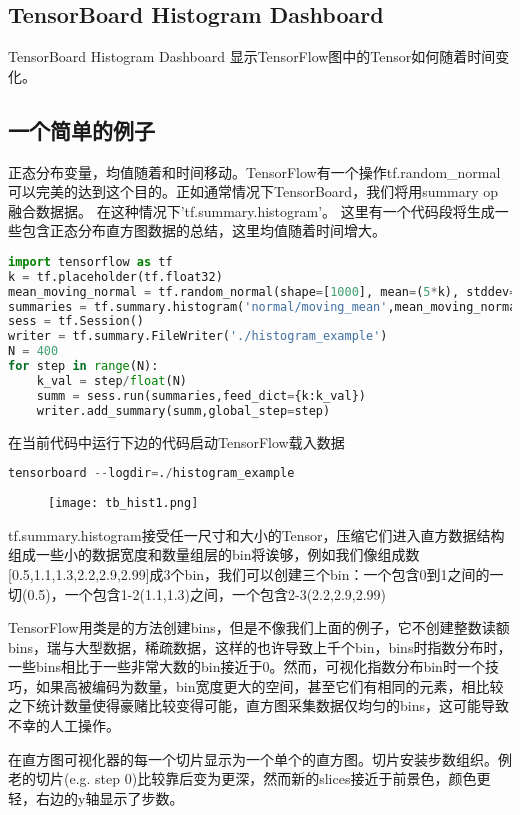 \subsection{TensorBoard Histogram Dashboard}

TensorBoard Histogram Dashboard 显示TensorFlow图中的Tensor如何随着时间变化。
\subsection{一个简单的例子}
正态分布变量，均值随着和时间移动。TensorFlow有一个操作tf.random\_normal可以完美的达到这个目的。正如通常情况下TensorBoard，我们将用summary op融合数据据。
在这种情况下'tf.summary.histogram'。
这里有一个代码段将生成一些包含正态分布直方图数据的总结，这里均值随着时间增大。
\begin{lstlisting}[language=Python]
import tensorflow as tf
k = tf.placeholder(tf.float32)
mean_moving_normal = tf.random_normal(shape=[1000], mean=(5*k), stddev=1)
summaries = tf.summary.histogram('normal/moving_mean',mean_moving_normal)
sess = tf.Session()
writer = tf.summary.FileWriter('./histogram_example')
N = 400
for step in range(N):
    k_val = step/float(N)
    summ = sess.run(summaries,feed_dict={k:k_val})
    writer.add_summary(summ,global_step=step)
\end{lstlisting}
在当前代码中运行下边的代码启动TensorFlow载入数据
\begin{lstlisting}[language=Python]
tensorboard --logdir=./histogram_example
\end{lstlisting}
\begin{center}
\begin{figure}[H]
\texttt{[image: tb\_hist1.png]}
\end{figure}
\end{center}
tf.summary.histogram接受任一尺寸和大小的Tensor，压缩它们进入直方数据结构组成一些小的数据宽度和数量组层的bin将诶够，例如我们像组成数[0.5,1.1,1.3,2.2,2.9,2.99]成3个bin，我们可以创建三个bin：一个包含0到1之间的一切(0.5)，一个包含1-2(1.1,1.3)之间，一个包含2-3(2.2,2.9,2.99)

  TensorFlow用类是的方法创建bins，但是不像我们上面的例子，它不创建整数读额bins，瑞与大型数据，稀疏数据，这样的也许导致上千个bin，bins时指数分布时，一些bins相比于一些非常大数的bin接近于0。然而，可视化指数分布bin时一个技巧，如果高被编码为数量，bin宽度更大的空间，甚至它们有相同的元素，相比较之下统计数量使得豪赌比较变得可能，直方图采集数据仅均匀的bins，这可能导致不幸的人工操作。

在直方图可视化器的每一个切片显示为一个单个的直方图。切片安装步数组织。例老的切片(e.g. step 0)比较靠后变为更深，然而新的slices接近于前景色，颜色更轻，右边的y轴显示了步数。

